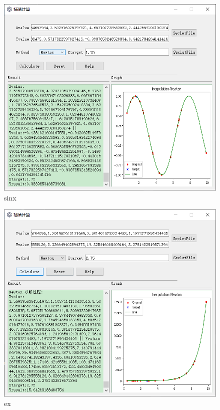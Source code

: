 \documentclass[UTF8]{ctexart}
\begin{document}
            \begin{figure}[htb]
                \centering
                \includegraphics[scale = 0.6]{sinx.png}
                \caption{sinx}
                \label{fig:测试3}
            \end{figure}
            \begin{figure}[htb]
                \centering
                \includegraphics[scale = 0.6]{ex.png}
                \caption{ex}
                \label{fig:测试4}
            \end{figure}
\end{document}
